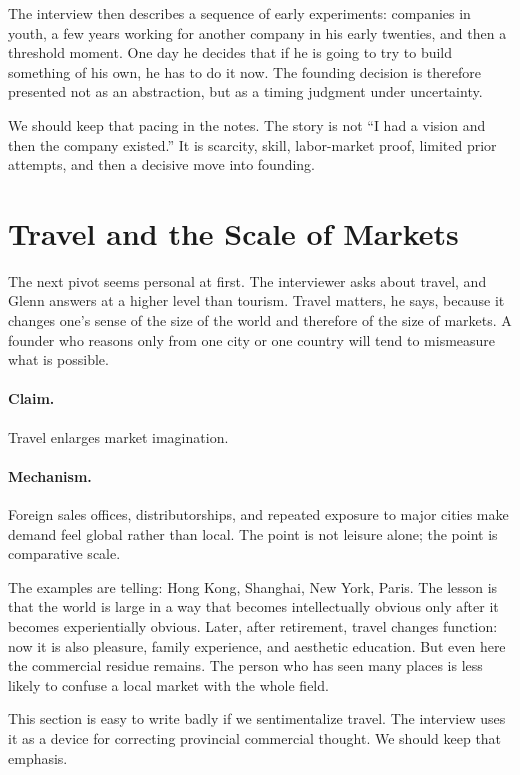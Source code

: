 The interview then describes a sequence of early experiments: companies in youth, a few years working for another company in his early twenties, and then a threshold moment. One day he decides that if he is going to try to build something of his own, he has to do it now. The founding decision is therefore presented not as an abstraction, but as a timing judgment under uncertainty.

We should keep that pacing in the notes. The story is not ``I had a vision and then the company existed.'' It is scarcity, skill, labor-market proof, limited prior attempts, and then a decisive move into founding.

\section{Travel and the Scale of Markets}

The next pivot seems personal at first. The interviewer asks about travel, and Glenn answers at a higher level than tourism. Travel matters, he says, because it changes one's sense of the size of the world and therefore of the size of markets. A founder who reasons only from one city or one country will tend to mismeasure what is possible.

\paragraph{Claim.} Travel enlarges market imagination.

\paragraph{Mechanism.} Foreign sales offices, distributorships, and repeated exposure to major cities make demand feel global rather than local. The point is not leisure alone; the point is comparative scale.

The examples are telling: Hong Kong, Shanghai, New York, Paris. The lesson is that the world is large in a way that becomes intellectually obvious only after it becomes experientially obvious. Later, after retirement, travel changes function: now it is also pleasure, family experience, and aesthetic education. But even here the commercial residue remains. The person who has seen many places is less likely to confuse a local market with the whole field.

This section is easy to write badly if we sentimentalize travel. The interview uses it as a device for correcting provincial commercial thought. We should keep that emphasis.

